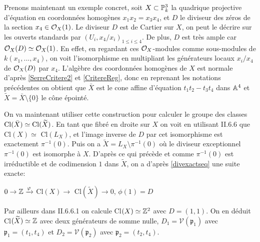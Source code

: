 Prenons maintenant un exemple concret, soit $X\subset \mathbb{P}^3_k$ la quadrique projective d'équation en coordonnées homogènes $x_1x_2=x_3x_4$, et $D$ le diviseur des zéros de la section $x_4\in\mathcal{O}_X(1)$. Le diviseur $D$ est de Cartier sur $X$, on peut le décrire sur les ouverts standards par $(U_i, x_4/x_i)_{1\leq i\leq 4}$. De plus, $D$ est très ample car $\mathcal{O}_X(D)\simeq \mathcal{O}_X(1)$. En effet, en regardant ces $\mathcal{O}_X$-modules comme sous-modules de $k(x_1,...,x_4)$, on voit l'isomorphisme en multipliant les générateurs locaux $x_i/x_4$ de $\mathcal{O}_X(D)$ par $x_4$. L'algèbre des coordonnées homogènes de $X$ est normale d'après \ref{SerreCritere2} et \ref{CritereReg}, donc en reprenant les notations précédentes on obtient que $\bar{X}$ est le cone affine d'équation $t_1t_2-t_3t_4$ dans $\mathbb{A}^4$ et $\widetilde{X}=\bar{X}\setminus\lbrace 0 \rbrace$ le cône épointé. 

On va maintenant utiliser cette construction pour calculer le groupe des classes $\operatorname{Cl}(\bar{X})\simeq \operatorname{Cl}(\widetilde{X})$. En tant que fibré en droite sur $X$ on voit en utilisant \cite{Hartshorne} II.6.6 que Cl$(X)\simeq$ Cl$(L_X)$, et l'image inverse de $D$ par cet isomorphisme est exactement $\pi^{-1}(0)$. Puis on a $\widetilde{X}=L_X \setminus \pi^{-1}(0)$ où le diviseur exceptionnel $\pi^{-1}(0)$ est isomorphe à $X$. D'après ce qui précède et comme $\pi^{-1}(0)$ est irréductible et de codimension $1$ dans $\widetilde{X}$, on a d'après \ref{divexactseq} une suite exacte:
\begin{center}
$ 0\rightarrow\mathbb{Z}\xrightarrow{\varphi}$ Cl$(X) \rightarrow$ Cl$(\widetilde{X}) \rightarrow 0$, $\phi(1)=D$
\end{center}
Par ailleurs dans \cite{Hartshorne} II.6.6.1 on calcule Cl$(X)\simeq \mathbb{Z}^2$ avec $D=(1,1)$. On en déduit Cl$(\widetilde{X})\simeq \mathbb{Z}$ avec deux générateurs de somme nulle, $D_1=\mathcal{V}(\mathfrak{p}_1)$ avec $\mathfrak{p}_1=(t_1,t_4)$ et $D_2=\mathcal{V}(\mathfrak{p}_2)$ avec $\mathfrak{p}_2=(t_2,t_4)$.

